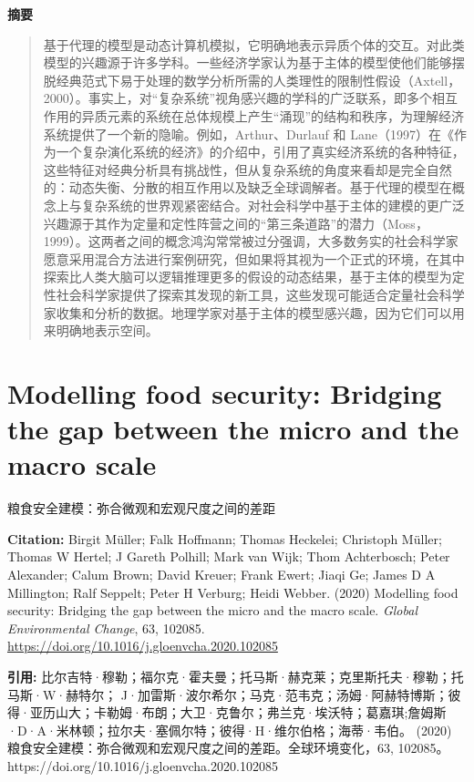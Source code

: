 \noindent\textbf{摘要}\par
\begin{quote}\small
基于代理的模型是动态计算机模拟，它明确地表示异质个体的交互。对此类模型的兴趣源于许多学科。一些经济学家认为基于主体的模型使他们能够摆脱经典范式下易于处理的数学分析所需的人类理性的限制性假设（Axtell，2000）。事实上，对“复杂系统”视角感兴趣的学科的广泛联系，即多个相互作用的异质元素的系统在总体规模上产生“涌现”的结构和秩序，为理解经济系统提供了一个新的隐喻。例如，Arthur、Durlauf 和 Lane（1997）在《作为一个复杂演化系统的经济》的介绍中，引用了真实经济系统的各种特征，这些特征对经典分析具有挑战性，但从复杂系统的角度来看却是完全自然的：动态失衡、分散的相互作用以及缺乏全球调解者。基于代理的模型在概念上与复杂系统的世界观紧密结合。对社会科学中基于主体的建模的更广泛兴趣源于其作为定量和定性阵营之间的“第三条道路”的潜力（Moss，1999）。这两者之间的概念鸿沟常常被过分强调，大多数务实的社会科学家愿意采用混合方法进行案例研究，但如果将其视为一个正式的环境，在其中探索比人类大脑可以逻辑推理更多的假设的动态结果，基于主体的模型为定性社会科学家提供了探索其发现的新工具，这些发现可能适合定量社会科学家收集和分析的数据。地理学家对基于主体的模型感兴趣，因为它们可以用来明确地表示空间。
\end{quote}

\vspace{0.5em}
\chapter{Modelling food security: Bridging the gap between the micro and the macro scale}
\begin{center}\small 粮食安全建模：弥合微观和宏观尺度之间的差距\end{center}

\noindent\textbf{Citation:} Birgit Müller; Falk Hoffmann; Thomas Heckelei; Christoph Müller; Thomas W Hertel; J Gareth Polhill; Mark van Wijk; Thom Achterbosch; Peter Alexander; Calum Brown; David Kreuer; Frank Ewert; Jiaqi Ge; James D A Millington; Ralf Seppelt; Peter H Verburg; Heidi Webber. (2020) Modelling food security: Bridging the gap between the micro and the macro scale. \textit{Global Environmental Change}, 63, 102085. \url{https://doi.org/10.1016/j.gloenvcha.2020.102085}

\vspace{0.5em}
\noindent\textbf{引用:} 比尔吉特·穆勒；福尔克·霍夫曼；托马斯·赫克莱；克里斯托夫·穆勒；托马斯·W·赫特尔； J·加雷斯·波尔希尔；马克·范韦克；汤姆·阿赫特博斯；彼得·亚历山大；卡勒姆·布朗；大卫·克鲁尔；弗兰克·埃沃特；葛嘉琪;詹姆斯·D·A·米林顿；拉尔夫·塞佩尔特；彼得·H·维尔伯格；海蒂·韦伯。 (2020) 粮食安全建模：弥合微观和宏观尺度之间的差距。全球环境变化，63, 102085。 https://doi.org/10.1016/j.gloenvcha.2020.102085

